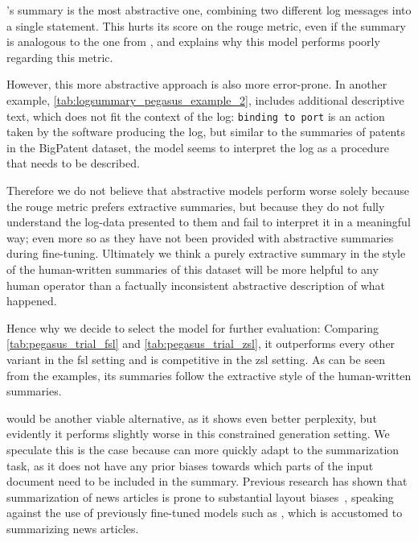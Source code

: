 's summary is the most abstractive one, combining two different log messages into a single statement.
This hurts its score on the \acs{rouge} metric, even if the summary is analogous to the one from ,
and explains why this model performs poorly regarding this metric.

However, this more abstractive approach is also more error-prone.
In another example, \autoref{tab:logsummary_pegasus_example_2},  includes additional descriptive text,
which does not fit the context of the log:
\verb+binding to port+ is an action taken by the software producing the log,
but similar to the summaries of patents in the BigPatent dataset,
the model seems to interpret the log as a procedure that needs to be described.

Therefore we do not believe that abstractive models perform worse solely because the \acs*{rouge} metric prefers extractive summaries,
but because they do not fully understand the log-data presented to them and fail to interpret it in a meaningful way;
even more so as they have not been provided with abstractive summaries during fine-tuning.
Ultimately we think a purely extractive summary in the style of the human-written summaries of this dataset will be more helpful to any human operator
than a factually inconsistent abstractive description of what happened.

Hence why we decide to select the  model for further evaluation:
Comparing \autoref{tab:pegasus_trial_fsl} and \autoref{tab:pegasus_trial_zsl}, it outperforms every other variant in the \ac{fsl} setting and is competitive in the \ac{zsl} setting.
As can be seen from the examples, its summaries follow the extractive style of the human-written summaries.

 would be another viable alternative, as it shows even better perplexity,
but evidently it performs slightly worse in this constrained generation setting.
We speculate this is the case because  can more quickly adapt to the summarization task,
as it does not have any prior biases towards which parts of the input document need to be included in the summary.
Previous research has shown that summarization of news articles is prone to substantial layout biases~\parencite[544]{summarization_critical_evaluation},
speaking against the use of previously fine-tuned models such as ,
which is accustomed to summarizing news articles.

